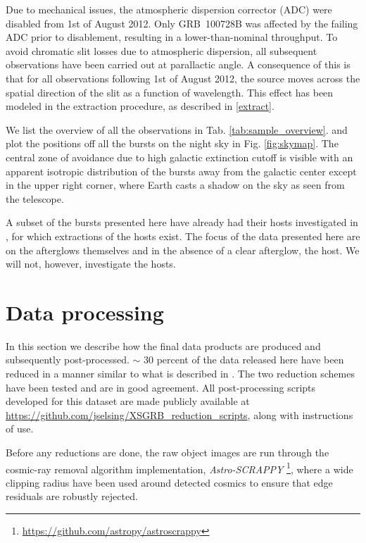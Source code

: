 \documentclass{aa}    %
\begin{document}
Due to mechanical issues, the atmospheric dispersion corrector (ADC) were
disabled from 1st of August 2012. Only GRB~100728B was affected by the failing
ADC prior to disablement, resulting in a lower-than-nominal throughput. To avoid
chromatic slit losses due to atmospheric dispersion, all subsequent observations
have been carried out at parallactic angle. A consequence of this is that for
all observations following 1st of August 2012, the source moves across the
spatial direction of the slit as a function of wavelength. This effect has been
modeled in the extraction procedure, as described in \ref{extract}.

We list the overview of all the observations in Tab. \ref{tab:sample_overview}.
 and plot the positions off all the bursts on
the night sky in Fig. \ref{fig:skymap}. The central zone of avoidance due to
high galactic extinction cutoff is visible with an apparent isotropic
distribution of the bursts away from the galactic center except in the upper
right corner, where Earth casts a shadow on the sky as seen from the telescope.

A subset of the bursts presented here  have already had their hosts investigated
in \citet{Kruhler2015}, for which extractions of the hosts exist. The focus of
the data presented here are on the afterglows themselves and in the absence of a
clear afterglow, the host. We will not, however, investigate the hosts.

\section{Data processing}

In this section we describe how the final data products are produced and
subsequently post-processed. $\sim$ 30 percent of the data released here have
been reduced in a manner similar to what is described in \citet{Kruhler2015}.
The two reduction schemes have been tested and are in good agreement. All
post-processing scripts developed for this dataset are made publicly available
at \url{https://github.com/jselsing/XSGRB_reduction_scripts}, along with
instructions of use.

Before any reductions are done, the raw object images are run through the
cosmic-ray removal algorithm \citep{VanDokkum2001} implementation,
\textit{Astro-SCRAPPY} \footnote{\url{https://github.com/astropy/astroscrappy}},
where a wide clipping radius have been used around detected cosmics to ensure that edge residuals are
robustly rejected. 
\end{document}
